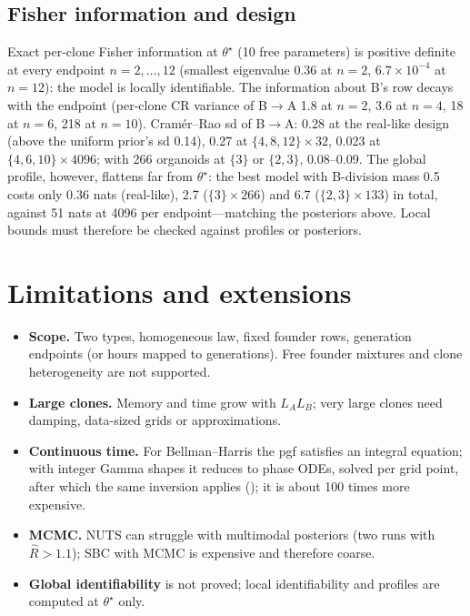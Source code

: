 \documentclass[11pt]{article}
\theoremstyle{definition}
\theoremstyle{remark}
\newcommand{\code}[1]{\texttt{\detokenize{#1}}}
\begin{document}
\subsection{Fisher information and design}
Exact per-clone Fisher information at $\theta^\star$ (10 free parameters) is positive definite at every endpoint $n=2,\dots,12$ (smallest eigenvalue 0.36 at $n=2$, $6.7\times10^{-4}$ at $n=12$): the model is locally identifiable. The information about B's row decays with the endpoint (per-clone CR variance of B$\to$A 1.8 at $n=2$, 3.6 at $n=4$, 18 at $n=6$, 218 at $n=10$). Cram\'er--Rao sd of B$\to$A: 0.28 at the real-like design (above the uniform prior's sd 0.14), 0.27 at $\{4,8,12\}\times32$, 0.023 at $\{4,6,10\}\times4096$; with 266 organoids at $\{3\}$ or $\{2,3\}$, 0.08--0.09. The global profile, however, flattens far from $\theta^\star$: the best model with B-division mass 0.5 costs only 0.36 nats (real-like), 2.7 ($\{3\}\times266$) and 6.7 ($\{2,3\}\times133$) in total, against 51 nats at 4096 per endpoint---matching the posteriors above. Local bounds must therefore be checked against profiles or posteriors.

\section{Limitations and extensions}\label{sec:limits}
\begin{itemize}
\item \textbf{Scope.} Two types, homogeneous law, fixed founder rows, generation endpoints (or hours mapped to generations). Free founder mixtures and clone heterogeneity are not supported.
\item \textbf{Large clones.} Memory and time grow with $L_AL_B$; very large clones need damping, data-sized grids or approximations.
\item \textbf{Continuous time.} For Bellman--Harris the pgf satisfies an integral equation; with integer Gamma shapes it reduces to phase ODEs, solved per grid point, after which the same inversion applies (\code{bhexact.py}); it is about 100 times more expensive.
\item \textbf{MCMC.} NUTS can struggle with multimodal posteriors (two runs with $\hat R>1.1$); SBC with MCMC is expensive and therefore coarse.
\item \textbf{Global identifiability} is not proved; local identifiability and profiles are computed at $\theta^\star$ only.
\end{itemize}
\end{document}
